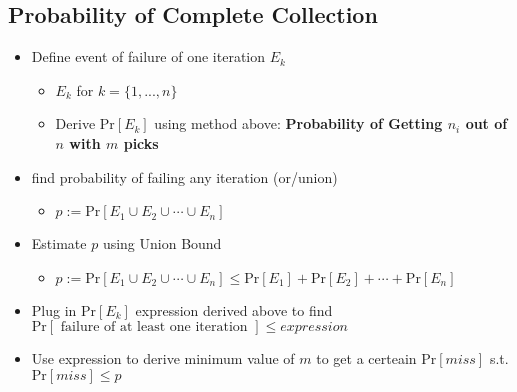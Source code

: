 \documentclass{article}\usepackage{amsmath,amssymb,amsthm,tikz,tkz-graph,color,chngpage,soul,hyperref,csquotes,graphicx,floatrow, listings}\newcommand*{\QEDB}{\hfill\ensuremath{\square}}\newtheorem*{prop}{Proposition}\renewcommand{\theenumi}{\alph{enumi}}\usepackage[shortlabels]{enumitem}\usepackage[nobreak=true]{mdframed}\usetikzlibrary{matrix,calc}\MakeOuterQuote{"}\usepackage[margin=0.75in]{geometry} \newtheorem{theorem}{Theorem}\newcommand{\Z}{\mathbb Z}\newcommand{\R}{\mathbb R}\newcommand{\Q}{\mathbb Q}\newcommand{\N}{\mathbb N}\newcommand{\x}[1]{\textrm{ #1 }}\newcommand{\pr}{\textrm{Pr}}
\begin{document}
\subsection*{Probability of Complete Collection}
\begin{itemize}
\item Define event of failure of one iteration $E_k$
\begin{itemize}
\item $E_k$ for $k=\{1,...,n\}$
\item Derive $\pr[E_k]$ using method above: \textbf{Probability of Getting $n_i$ out of $n$ with $m$ picks}
\end{itemize}
\item find probability of failing any iteration (or/union)
\begin{itemize}
\item $p := \pr[E_1\cup E_2\cup\cdots\cup E_n]$
\end{itemize}
\item Estimate $p$ using Union Bound
\begin{itemize}
\item $p := \pr[E_1\cup E_2\cup\cdots\cup E_n]\le \pr[E_1]+\pr[E_2]+\cdots+\pr[E_n]$
\end{itemize}
\item Plug in $\pr[E_k]$ expression derived above to find $\pr[\x{failure of at least one iteration}] \le expression$
\item Use expression to derive minimum value of $m$ to get a certeain $\pr[miss]$ s.t. $\pr[miss]\le p$
\end{itemize}
\end{document}
